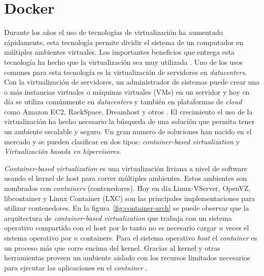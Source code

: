 \section{Docker}

	Durante los años el uso de tecnologías de virtualización ha aumentado
	rápidamente, esta tecnología permite dividir el sistema de un computador
	en múltiples ambientes virtuales. Los importantes beneficios que entrega esta
	tecnología ha hecho que la virtualización sea muy utilizada \cite{bui2015analysis}.
	Uno de los usos comunes para esta tecnología es la virtualización de 
	servidores en \textit{datacenters}. Con la virtualización de servidores, un
	administrador de sistemas puede crear una o más instancias virtuales o 
	máquinas virtuales (VMs) en un servidor y hoy en día se utiliza comúnmente en
	\textit{datacenters} y también en plataformas de \textit{cloud} como Amazon
	EC2, RackSpace, Dreamhost y otros \cite{felter2014updated}. El crecimiento
	el uso de la virtualización ha hecho necesario la búsqueda de una solución
	que permita tener un ambiente escalable y seguro. Un gran numero de
	soluciones han nacido en el mercado y se pueden clasificar en dos tipos:
	\textit{container-based virtualization} y \textit{Virtualización basada en hipervisores}.

	\textit{Container-based virtualization} es una virtualización liviana a
	nivel de software usando el kernel de host para correr múltiples ambientes.
	Estos ambientes son nombrados con \textit{containers} (contenedores).
	Hoy en día Linux-VServer, OpenVZ, libcontainer y Linux Container (LXC) son
	las principales implementaciones para utilizar contenedores. En la
	figura~\ref{fig:container-arch} se puede observar que la arquitectura de
	\textit{container-based virtualization}  que trabaja con un sistema
	operativo compartido con el host por lo tanto no es necesario cargar \(n\) veces el sistema
	operativo por \(n\) containers. Para el sistema operativo \textit{host} el
	\textit{container} es un proceso más que corre encima del kernel. Gracias al
	kernel y otras herramientas proveen un ambiente aislado con los recursos limitados
	necesarios para ejecutar las aplicaciones en el \textit{container} \cite{merkel2014docker}.
	
